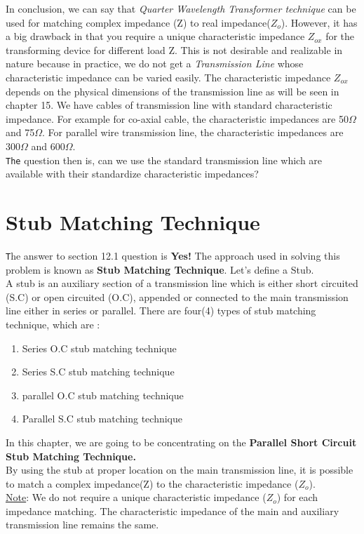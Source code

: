 In conclusion, we can say that\textit{ Quarter Wavelength Transformer technique} can be used for matching complex impedance (Z) to real impedance($Z_o$). However, it has a big drawback in that you require a unique characteristic impedance $Z_{ox}$ for the transforming device for different load Z. This is not desirable and realizable in nature because in practice, we do not get a\textit{ Transmission Line} whose characteristic impedance can be varied easily. The characteristic impedance $Z_{ox}$  depends on the physical dimensions of the transmission line as will be seen in chapter 15. We have cables of transmission line with standard characteristic impedance. For example for co-axial cable, the characteristic impedances are 50$\Omega$ and 75$\Omega$. For parallel wire transmission line, the characteristic impedances are 300$\Omega$ and 600$\Omega$.\\
\verb|The| question then is, can we use the standard transmission line which are available with their standardize characteristic impedances?
\section{Stub Matching Technique}
\verb|T|he answer to section 12.1 question is \textbf{Yes!} The approach used in solving this problem is known as \textbf{Stub Matching Technique}. Let's define a Stub.\\

A stub is an auxiliary section of a transmission line which is either short circuited (S.C) or open circuited (O.C), appended or connected to the main transmission line either in series or parallel. There are four(4) types of stub matching technique, which are :\\
\begin{enumerate}
\item Series O.C stub matching technique
\item Series S.C stub matching technique
\item parallel O.C stub matching technique
\item Parallel S.C stub matching technique
\end{enumerate}
In this chapter, we are going to be concentrating on the \textbf{Parallel Short Circuit Stub Matching Technique.}\\

By using the stub at proper location on the main transmission line, it is possible to match a complex impedance(Z) to the characteristic impedance ($Z_o$).\\
\underline{Note}: We do not require a unique characteristic impedance ($Z_o$) for each impedance matching. The characteristic impedance of the main and auxiliary transmission line remains the same.\\

